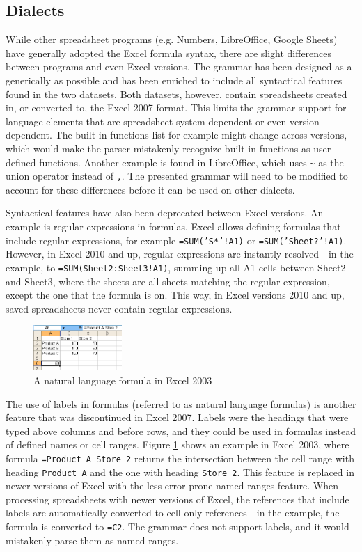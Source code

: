 \documentclass[conference]{IEEEtran}
\begin{document}
\subsection{Dialects}

While other spreadsheet programs (e.g. Numbers, LibreOffice, Google Sheets) have generally adopted the Excel formula syntax, there are slight differences between programs and even Excel versions.
The grammar has been designed as a generically as possible and has been enriched to include all syntactical features found in the two datasets.
Both datasets, however, contain spreadsheets created in, or converted to, the Excel 2007 format.
This limits the grammar support for language elements that are spreadsheet system-dependent or even version-dependent.
The built-in functions list for example might change across versions, which would make the parser mistakenly recognize built-in functions as user-defined functions.
Another example is found in LibreOffice, which uses \texttt{\~} as the union operator instead of \texttt{,}.
The presented grammar will need to be modified to account for these differences before it can be used on other dialects.

Syntactical features have also been deprecated between Excel versions.
An example is regular expressions in formulas.
Excel allows defining formulas that include regular expressions, for example \texttt{=SUM('S*'!A1)} or \texttt{=SUM('Sheet?'!A1)}.
However, in Excel 2010 and up, regular expressions are instantly resolved---in the example, to  \texttt{=SUM(Sheet2:Sheet3!A1)}, summing up all A1 cells between Sheet2 and Sheet3, where the sheets are all sheets matching the regular expression, except the one that the formula is on.
This way, in Excel versions 2010 and up, saved spreadsheets never contain regular expressions.
\begin{figure}
	\centering
	\includegraphics[width=0.3\textwidth]{labels}
	\caption{A natural language formula in Excel 2003}
	\label{fig:labels}
\end{figure}

The use of labels in formulas (referred to as natural language formulas) is another feature that was discontinued in Excel 2007.
Labels were the headings that were typed above columns and before rows, and they could be used in formulas instead of defined names or cell ranges.
Figure \ref{fig:labels} shows an example in Excel 2003, where formula \texttt{=Product A Store 2} returns the intersection between the cell range with heading \texttt{Product A} and the one with heading \texttt{Store 2}.
This feature is replaced in newer versions of Excel with the less error-prone named ranges feature.
When processing spreadsheets with newer versions of Excel, the references that include labels are automatically converted to cell-only references---in the example, the formula is converted to \texttt{=C2}.
The grammar does not support labels, and it would mistakenly parse them as named ranges.
\end{document}
